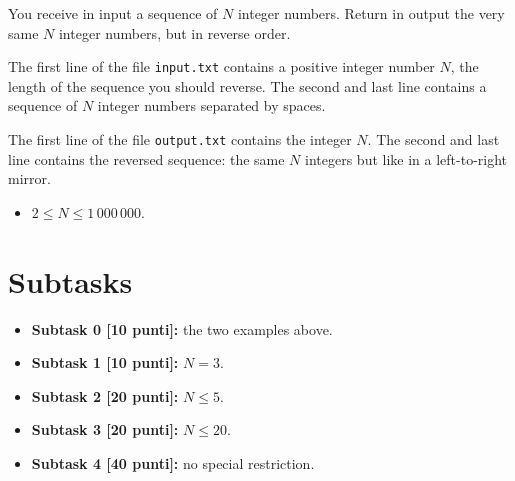 \renewcommand{\nomebreve}{rovesciaseq}
\renewcommand{\titolo}{Reverse a sequence}

\introduzione{}

You receive in input a sequence of $N$ integer numbers.
Return in output the very same $N$ integer numbers,
but in reverse order.

The first line of the file \verb'input.txt'
contains a positive integer number $N$, the length of the sequence you should reverse.
The second and last line
contains a sequence of $N$ integer numbers separated by spaces.

The first line of the file \verb'output.txt'
contains the integer $N$.
The second and last line
contains the reversed sequence:
the same $N$ integers but like in a left-to-right mirror.



\begin{itemize}[nolistsep, noitemsep]
  \item $2 \le N \le 1\,000\,000$.
\end{itemize}
  
  \section*{Subtasks}
  \begin{itemize}
    \item \textbf{Subtask 0 [10 punti]:} the two examples above.
    \item \textbf{Subtask 1 [10 punti]:} $N = 3$.
    \item \textbf{Subtask 2 [20 punti]:} $N \leq 5$.
    \item \textbf{Subtask 3 [20 punti]:} $N \leq 20$.
    \item \textbf{Subtask 4 [40 punti]:} no special restriction.
  \end{itemize}
  
